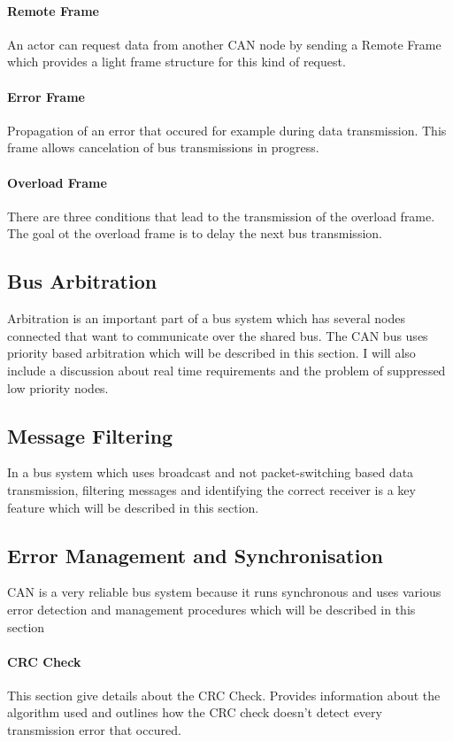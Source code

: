 	\paragraph{Remote Frame}
	An actor can request data from another CAN node by sending a Remote Frame
	which provides a light frame structure for this kind of request.
	
	\paragraph{Error Frame}
    Propagation of an error that occured for example during data transmission.
    This frame allows cancelation of bus transmissions in progress.
    
    \paragraph{Overload Frame}
	There are three conditions that lead to the transmission of the overload frame.
	The goal ot the overload frame is to delay the next bus transmission.
    
\subsection{Bus Arbitration}
Arbitration is an important part of a bus system which has several nodes
connected that want to communicate over the shared bus. The CAN bus uses
priority based arbitration which will be described in this section. I will also
include a discussion about real time requirements and the problem of suppressed
low priority nodes.
\subsection{Message Filtering}
In a bus system which uses broadcast and not packet-switching based data
transmission, filtering messages and identifying the correct receiver is a key
feature which will be described in this section.
\subsection{Error Management and Synchronisation}
CAN is a very reliable bus system because it runs synchronous and uses various
error detection and management procedures which will be described in this
section
	\paragraph{CRC Check}
	This section give details about the CRC Check. Provides information about the
	algorithm used and outlines how the CRC check doesn't detect every transmission
	error that occured.
